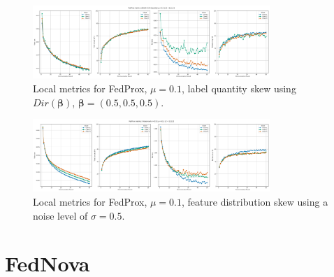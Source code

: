 \begin{figure}[H]
  \centering
  \includegraphics[width=0.8\textwidth]{figures/2-Federated_Learning/FedProx_QuantitySkew_Dir_05_Mu_0.1.png}
  \caption{Local metrics for FedProx, $\mu = 0.1$, label quantity skew using $Dir(\boldsymbol{\beta})$, $\boldsymbol{\beta} = (0.5,0.5,0.5)$.}
  \label{fig:FedProx_LabelsQuantitySkew_Dir_05_Mu_0.1}
\end{figure}

\begin{figure}[H]
  \centering
  \includegraphics[width=0.8\textwidth]{figures/2-Federated_Learning/FedProx_NoiseLevel_Mu_0.1.png}
  \caption{Local metrics for FedProx, $\mu = 0.1$, feature distribution skew using a noise level of $\sigma = 0.5$.}
  \label{fig:FedProx_LabelsQuantitySkew_Dir_05_Mu_0.1}
\end{figure}


\section{FedNova}

